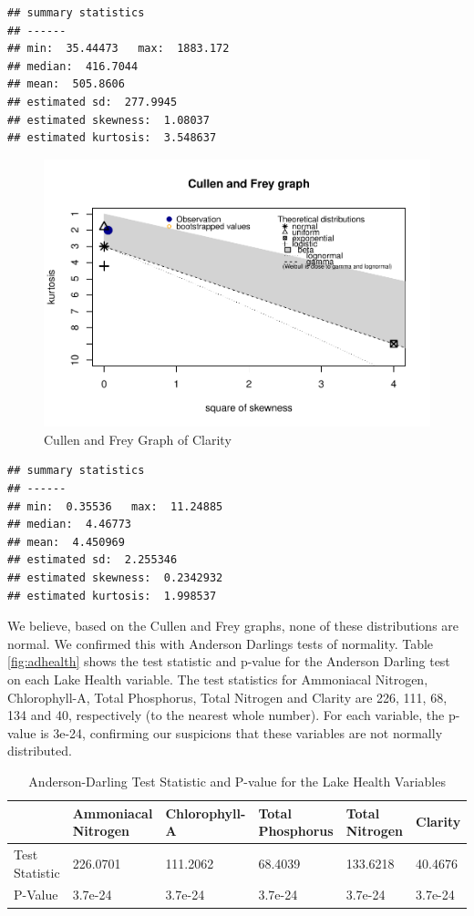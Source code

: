 \documentclass[
]{article}
\begin{document}
\begin{verbatim}
## summary statistics
## ------
## min:  35.44473   max:  1883.172 
## median:  416.7044 
## mean:  505.8606 
## estimated sd:  277.9945 
## estimated skewness:  1.08037 
## estimated kurtosis:  3.548637
\end{verbatim}

\begin{figure}
\centering
\includegraphics{Final-Report_files/figure-latex/cfSECCHI-1.pdf}
\caption{\label{fig:cfSECCHI}Cullen and Frey Graph of Clarity}
\end{figure}

\begin{verbatim}
## summary statistics
## ------
## min:  0.35536   max:  11.24885 
## median:  4.46773 
## mean:  4.450969 
## estimated sd:  2.255346 
## estimated skewness:  0.2342932 
## estimated kurtosis:  1.998537
\end{verbatim}

We believe, based on the Cullen and Frey graphs, none of these distributions are normal. We confirmed this with Anderson Darlings tests of normality. Table \ref{fig:adhealth} shows the test statistic and p-value for the Anderson Darling test on each Lake Health variable. The test statistics for Ammoniacal Nitrogen, Chlorophyll-A, Total Phosphorus, Total Nitrogen and Clarity are 226, 111, 68, 134 and 40, respectively (to the nearest whole number). For each variable, the p-value is 3e-24, confirming our suspicions that these variables are not normally distributed.

\begin{table}

\caption{\label{tab:adhealth}Anderson-Darling Test Statistic and P-value for the Lake Health Variables}
\centering
\begin{tabular}[t]{l|l|l|l|l|l}
\hline
  & Ammoniacal Nitrogen & Chlorophyll-A & Total Phosphorus & Total Nitrogen & Clarity\\
\hline
Test Statistic & 226.0701 & 111.2062 & 68.4039 & 133.6218 & 40.4676\\
\hline
P-Value & 3.7e-24 & 3.7e-24 & 3.7e-24 & 3.7e-24 & 3.7e-24\\
\hline
\end{tabular}
\end{table}
\end{document}
